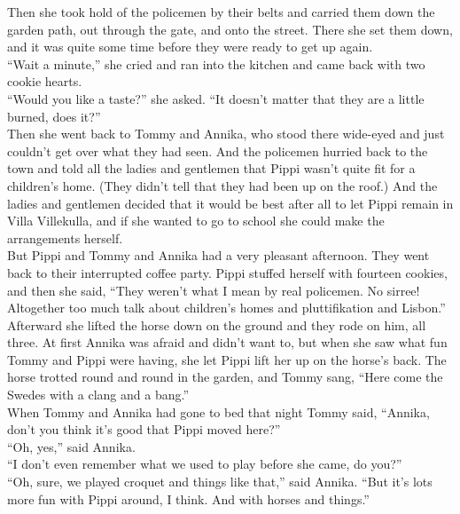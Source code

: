 \documentclass{standard}
\begin{document}
Then she took hold of the policemen by their belts and carried them down the garden path, out through the gate, and onto the street. There she set them down, and it was quite some time before they were ready to get up again.\\

“Wait a minute,” she cried and ran into the kitchen and came back with two cookie hearts.\\

“Would you like a taste?” she asked. “It doesn’t matter that they are a little burned, does it?”\\

Then she went back to Tommy and Annika, who stood there wide-eyed and just couldn’t get over what they had seen. And the policemen hurried back to the town and told all the ladies and gentlemen that Pippi wasn’t quite fit for a children’s home. (They didn’t tell that they had been up on the roof.) And the ladies and gentlemen decided that it would be best after all to let Pippi remain in Villa Villekulla, and if she wanted to go to school she could make the arrangements herself.\\

But Pippi and Tommy and Annika had a very pleasant afternoon. They went back to their interrupted coffee party. Pippi stuffed herself with fourteen cookies, and then she said, “They weren’t what I mean by real policemen. No sirree! Altogether too much talk about children’s homes and pluttifikation and Lisbon.”\\

Afterward she lifted the horse down on the ground and they rode on him, all three. At first Annika was afraid and didn’t want to, but when she saw what fun Tommy and Pippi were having, she let Pippi lift her up on the horse’s back. The horse trotted round and round in the garden, and Tommy sang, “Here come the Swedes with a clang and a bang.”\\

When Tommy and Annika had gone to bed that night Tommy said, “Annika, don’t you think it’s good that Pippi moved here?”\\

“Oh, yes,” said Annika.\\

“I don’t even remember what we used to play before she came, do you?”\\

“Oh, sure, we played croquet and things like that,” said Annika. “But it’s lots more fun with Pippi around, I think. And with horses and things.”\\
\newpage
\end{document}
